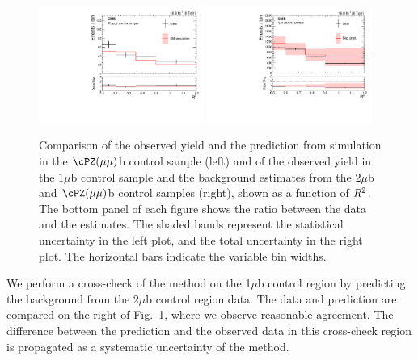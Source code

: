 \begin{figure}
\centering
   \includegraphics[width=0.48\textwidth]{BtagPlots/MC_CP_2Mu1LbZ_Sep.pdf}
   \includegraphics[width=0.48\textwidth]{BtagPlots/Closure_CP_1mu1Tb_SYS_Sep.pdf}
 \caption{Comparison of the observed yield and the
   prediction from simulation in the $\cPZ(\mu\mu)$b control sample (left)
   and of the observed yield in the $1\mu$b control sample and
   the background estimates from the 2$\mu$b and $\cPZ(\mu\mu)$b
   control samples (right), shown as a function of $R^2$. The bottom
   panel of each figure shows the ratio between the data and the
   estimates. The shaded bands represent the statistical uncertainty
   in the left plot, and the total uncertainty in the right plot. The horizontal bars indicate
the variable bin widths.\label{fig:Zmumub}}
\end{figure}

We perform a cross-check of the method on the 1$\mu$b control region
by predicting the background from the 2$\mu$b control region data.
The data and prediction are compared on the right of Fig.~\ref{fig:Zmumub},
where we observe reasonable agreement. The difference between the 
prediction and the observed data in this cross-check region is propagated as a
systematic uncertainty of the method. 

